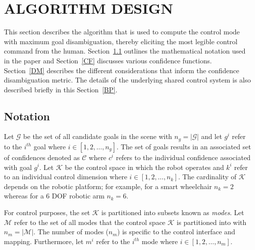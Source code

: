 \documentclass[conference]{IEEEtran}
\begin{document}
\section{ALGORITHM DESIGN} \label{ALGO}
This section describes the algorithm that is used to compute the control mode with maximum goal disambiguation, thereby eliciting the most legible control command from the human. Section~\ref{NOT} outlines the mathematical notation used in the paper and Section~\ref{CF} discusses various confidence functions. Section~\ref{DM} describes the different considerations that inform the confidence disambiguation metric. The details of the underlying shared control system is also described briefly in this Section~\ref{BP}.

\subsection{Notation}\label{NOT}


Let $\mathcal{G}$ be the set of all candidate goals in the scene with $n_g = \vert\mathcal{G}\vert$ and let $g^{i}$ refer to the $i^{th}$ goal where $i \in [1,2,\dots,n_g]$. The set of goals results in an associated set of confidences denoted as $\mathcal{C}$ where $c^{i}$ refers to the individual confidence associated with goal $g^{i}$. Let $\mathcal{K}$ be the control space in which the robot operates and $k^{i}$ refer to an individual control dimension where $i \in [1,2,\dots,n_k]$.  The cardinality of $\mathcal{K}$ depends on the robotic platform; for example, for a smart wheelchair $n_k = 2$ whereas for a 6 DOF robotic arm $n_k = 6$.

For control purposes, the set $\mathcal{K}$ is partitioned into subsets known as \textit{modes}. Let $\mathcal{M}$ refer to the set of all modes that the control space $\mathcal{K}$ is partitioned into with $n_{m} = \vert\mathcal{M}\vert$. The number of modes ($n_{m}$) is specific to the control interface and mapping. Furthermore, let $m^{i}$ refer to the $i^{th}$ mode where $i \in [1,2,\dots,n_{m}]$.
\end{document}
